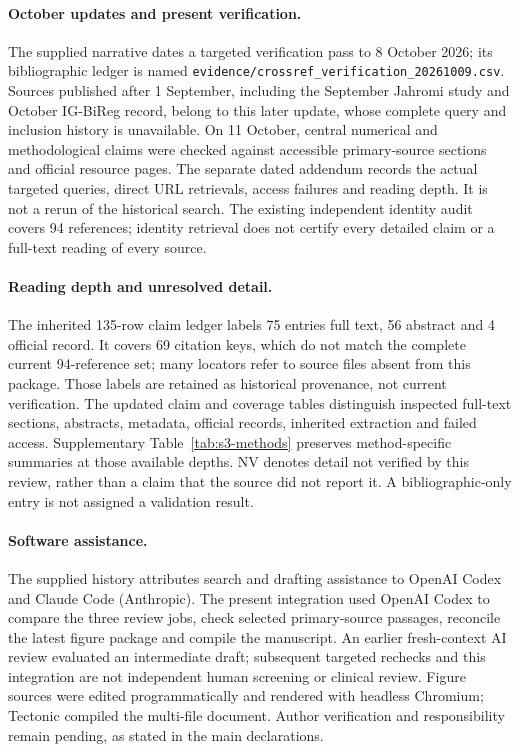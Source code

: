 \documentclass[11pt,a4paper]{article}
\begin{document}
\paragraph{October updates and present verification.} The supplied narrative dates a targeted verification pass to 8 October 2026; its bibliographic ledger is named \texttt{evidence/crossref\_verification\_20261009.csv}. Sources published after 1 September, including the September Jahromi study and October IG-BiReg record, belong to this later update, whose complete query and inclusion history is unavailable. On 11 October, central numerical and methodological claims were checked against accessible primary-source sections and official resource pages. The separate dated addendum records the actual targeted queries, direct URL retrievals, access failures and reading depth. It is not a rerun of the historical search. The existing independent identity audit covers 94 references; identity retrieval does not certify every detailed claim or a full-text reading of every source.

\paragraph{Reading depth and unresolved detail.} The inherited 135-row claim ledger labels 75 entries full text, 56 abstract and 4 official record. It covers 69 citation keys, which do not match the complete current 94-reference set; many locators refer to source files absent from this package. Those labels are retained as historical provenance, not current verification. The updated claim and coverage tables distinguish inspected full-text sections, abstracts, metadata, official records, inherited extraction and failed access. Supplementary Table~\ref{tab:s3-methods} preserves method-specific summaries at those available depths. NV denotes detail not verified by this review, rather than a claim that the source did not report it. A bibliographic-only entry is not assigned a validation result.

\paragraph{Software assistance.} The supplied history attributes search and drafting assistance to OpenAI Codex and Claude Code (Anthropic). The present integration used OpenAI Codex to compare the three review jobs, check selected primary-source passages, reconcile the latest figure package and compile the manuscript. An earlier fresh-context AI review evaluated an intermediate draft; subsequent targeted rechecks and this integration are not independent human screening or clinical review. Figure sources were edited programmatically and rendered with headless Chromium; Tectonic compiled the multi-file document. Author verification and responsibility remain pending, as stated in the main declarations.
\end{document}
